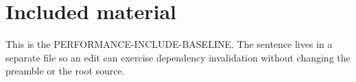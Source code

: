 \section{Included material}\label{sec:included}
This is the PERFORMANCE-INCLUDE-BASELINE. The sentence lives in a separate
file so an edit can exercise dependency invalidation without changing the
preamble or the root source.
